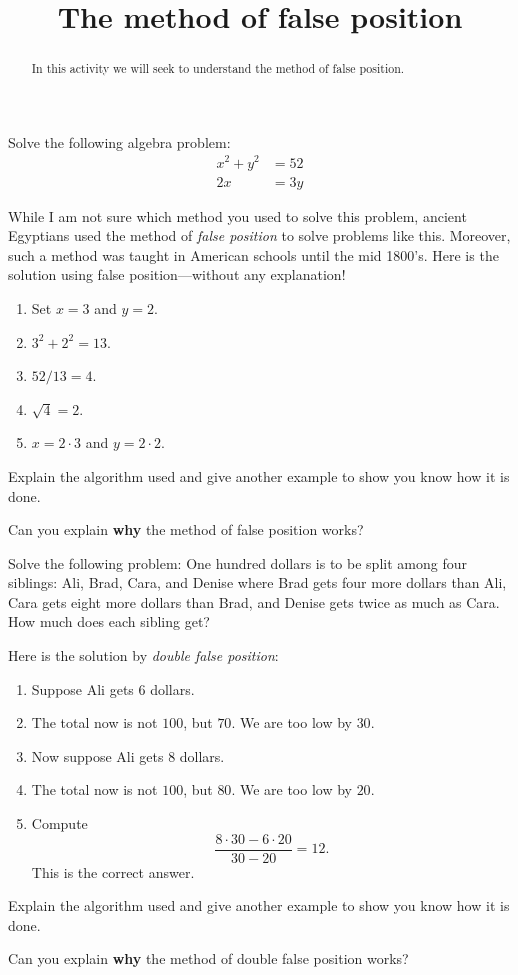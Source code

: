 \documentclass{ximera}
\title{The method of false position}
\begin{document}
\begin{abstract}
In this activity we will seek to understand the method of false position.\
\end{abstract}
\maketitle


\begin{exercise}
Solve the following algebra problem:
\begin{align*}
x^2 + y^2 &= 52\\
2x&=3y
\end{align*}
\end{exercise}


\begin{question}
While I am not sure which method you used to solve this problem, ancient Egyptians used the method of \textit{false position} to solve problems like this. Moreover, such a method was taught in American schools until the mid 1800's. Here is the solution using false position---without any explanation!
\begin{enumerate}
\item Set $x=3$ and $y=2$.
\item $3^2 + 2^2 = 13$.
\item $52/13 = 4$.
\item $\sqrt{4} = 2$.
\item $x = 2\cdot 3$ and $y = 2\cdot 2$.
\end{enumerate}
Explain the algorithm used and give another example to show you know how it
is done.
\end{question}


\begin{exploration}
Can you explain \textbf{why} the method of false position works?
\end{exploration}

\begin{exercise}
Solve the following problem: One hundred dollars is to be split
among four siblings: Ali, Brad, Cara, and Denise where Brad gets
four more dollars than Ali, Cara gets eight more dollars than Brad,
and Denise gets twice as much as Cara. How much does each sibling get?
\end{exercise}



\break

\begin{question}
Here is the solution by \textit{double false position}:
\begin{enumerate}
\item Suppose Ali gets $6$ dollars.
\item The total now is not $100$, but $70$. We are too low by $30$. 
\item Now suppose Ali gets $8$ dollars.
\item The total now is not $100$, but $80$. We are too low by $20$.
\item Compute
\[
\frac{8\cdot 30 - 6\cdot 20}{30-20} = 12.
\]
This is the correct answer. 
\end{enumerate}
Explain the algorithm used and give another example to show you know how it
is done.
\end{question}

\begin{exploration}
Can you explain \textbf{why} the method of double false position works?
\end{exploration}
\end{document}
